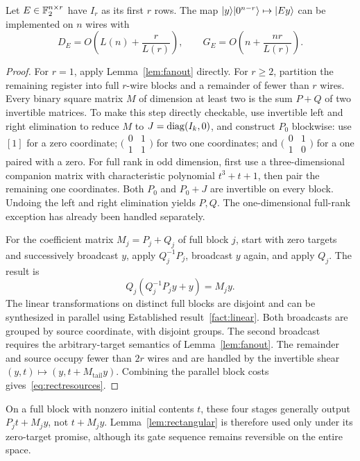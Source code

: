 \begin{lemma}\label{lem:rectangular}
Let $E\in\mathbb F_2^{n\times r}$ have $I_r$ as its first $r$ rows. The map $\lvert y\rangle\lvert 0^{n-r}\rangle\mapsto\lvert Ey\rangle$ can be implemented on $n$ wires with
\begin{equation}\label{eq:rectresources}
D_E=O\left(L(n)+\frac r{L(r)}\right),\qquad
G_E=O\left(n+\frac{nr}{L(r)}\right).
\end{equation}
\end{lemma}
\begin{proof}
For $r=1$, apply Lemma~\ref{lem:fanout} directly. For $r\ge2$, partition the remaining register into full $r$-wire blocks and a remainder of fewer than $r$ wires. Every binary square matrix $M$ of dimension at least two is the sum $P+Q$ of two invertible matrices. To make this step directly checkable, use invertible left and right elimination to reduce $M$ to $J=\operatorname{diag}(I_k,0)$, and construct $P_0$ blockwise: use $[1]$ for a zero coordinate; $\bigl(\begin{smallmatrix}0&1\\1&1\end{smallmatrix}\bigr)$ for two one coordinates; and $\bigl(\begin{smallmatrix}0&1\\1&0\end{smallmatrix}\bigr)$ for a one paired with a zero. For full rank in odd dimension, first use a three-dimensional companion matrix with characteristic polynomial $t^3+t+1$, then pair the remaining one coordinates. Both $P_0$ and $P_0+J$ are invertible on every block. Undoing the left and right elimination yields $P,Q$. The one-dimensional full-rank exception has already been handled separately.

For the coefficient matrix $M_j=P_j+Q_j$ of full block $j$, start with zero targets and successively broadcast $y$, apply $Q_j^{-1}P_j$, broadcast $y$ again, and apply $Q_j$. The result is
\[
Q_j(Q_j^{-1}P_jy+y)=M_jy.
\]
The linear transformations on distinct full blocks are disjoint and can be synthesized in parallel using Established result~\ref{fact:linear}. Both broadcasts are grouped by source coordinate, with disjoint groups. The second broadcast requires the arbitrary-target semantics of Lemma~\ref{lem:fanout}. The remainder and source occupy fewer than $2r$ wires and are handled by the invertible shear $(y,t)\mapsto(y,t+M_{\mathrm{tail}}y)$. Combining the parallel block costs gives~\eqref{eq:rectresources}.
\end{proof}
On a full block with nonzero initial contents $t$, these four stages generally output $P_jt+M_jy$, not $t+M_jy$. Lemma~\ref{lem:rectangular} is therefore used only under its zero-target promise, although its gate sequence remains reversible on the entire space.

